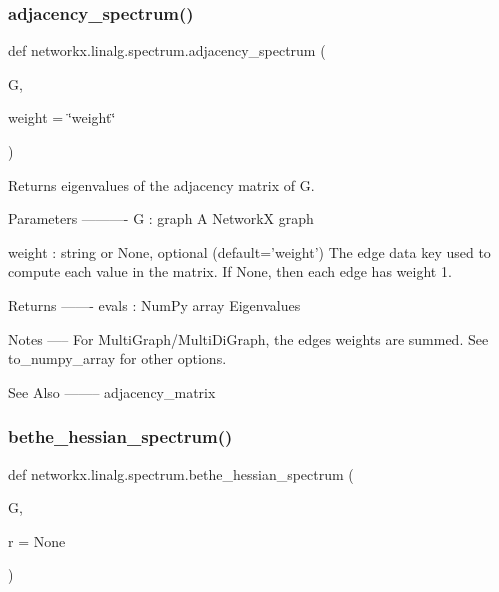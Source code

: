 \subsubsection{\texorpdfstring{adjacency\+\_\+spectrum()}{adjacency\_spectrum()}}
{\footnotesize\ttfamily def networkx.\+linalg.\+spectrum.\+adjacency\+\_\+spectrum (\begin{DoxyParamCaption}\item[{}]{G,  }\item[{}]{weight = {\ttfamily \char`\"{}weight\char`\"{}} }\end{DoxyParamCaption})}

\begin{DoxyVerb}Returns eigenvalues of the adjacency matrix of G.

Parameters
----------
G : graph
   A NetworkX graph

weight : string or None, optional (default='weight')
   The edge data key used to compute each value in the matrix.
   If None, then each edge has weight 1.

Returns
-------
evals : NumPy array
  Eigenvalues

Notes
-----
For MultiGraph/MultiDiGraph, the edges weights are summed.
See to_numpy_array for other options.

See Also
--------
adjacency_matrix
\end{DoxyVerb}
 \mbox{\label{namespacenetworkx_1_1linalg_1_1spectrum_aa1ab745086a1f90e352b4000d41764f7}} 
\subsubsection{\texorpdfstring{bethe\+\_\+hessian\+\_\+spectrum()}{bethe\_hessian\_spectrum()}}
{\footnotesize\ttfamily def networkx.\+linalg.\+spectrum.\+bethe\+\_\+hessian\+\_\+spectrum (\begin{DoxyParamCaption}\item[{}]{G,  }\item[{}]{r = {\ttfamily None} }\end{DoxyParamCaption})}

